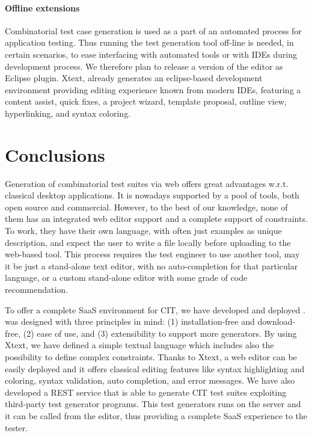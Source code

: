 \begin{tikzborder}{\cite{Gargantini16:validation}}
\begin{tikzborder}{\cite{gargantini_combinatorial_2017}}
\begin{tikzborder}{\cite{gargantini_combinatorial_2017}}
\begin{tikzborder}{\cite{garn2019}}
\begin{tikzborder}{\cite{arcaini2019achieving}}
\begin{tikzborder}{\cite{IWCTGargantini2018}}
\paragraph{Offline extensions}
Combinatorial test case generation is used as a part of an automated process for application testing. Thus  running the test generation tool off-line is needed, in certain scenarios, to ease interfacing with automated tools or with IDEs during development process. We therefore plan to release a version of the \ctwedge editor as Eclipse plugin.
Xtext, already generates an eclipse-based development environment providing editing experience known from modern IDEs, featuring a content assist, quick fixes, a project wizard, template proposal, outline view, hyperlinking, and syntax coloring.
\end{tikzborder}

\section{Conclusions} \label{sec:conclusions3}

\begin{tikzborder}{}
Generation of combinatorial test suites via web offers great advantages w.r.t. classical desktop applications. It is nowadays supported by a pool of tools, both open source and commercial. However, to the best of our knowledge, none of them has an integrated web editor support and a complete support of constraints. To work, they have their own language, with often just examples as unique description, and expect the user to write a file locally before uploading to the web-based tool. This process requires the test engineer to use another tool, may it be just a stand-alone text editor, with no auto-completion for that particular language, or a custom stand-alone editor with some grade of code recommendation.

To offer a complete SaaS environment for CIT, we have developed and deployed \ctwedge. 
\ctwedge was designed with three principles in mind: (1) installation-free and download-free, (2) ease of use, and (3) extensibility to support more generators. By using Xtext, we have defined a simple textual language which includes also the possibility to define complex constraints. Thanks to Xtext, a web editor can be easily deployed and it offers classical editing features like syntax highlighting and coloring, syntax validation, auto completion, and error messages. We have also developed a REST service that is able to generate CIT test suites exploiting third-party test generator programs. This test generators runs on the server and it can be called from the editor, thus providing a complete SaaS experience to the tester.
\end{tikzborder}




\end{tikzborder}
\end{tikzborder}
\end{tikzborder}
\end{tikzborder}
\end{tikzborder}
